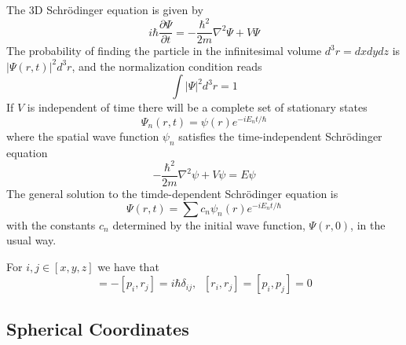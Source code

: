 \documentclass[12pt, a4paper, oneside, openright, titlepage]{book}
\begin{document}
The 3D Schr\"{o}dinger equation is given by \begin{equation*}
    \boxed{i\hbar\frac{\partial \Psi}{\partial t} = -\frac{\hbar^2}{2m}\nabla^2\Psi + V\Psi}
\end{equation*}
The probability of finding the particle in the infinitesimal volume $d^3r = dxdydz$ is $|\Psi(r,t)|^2d^3r$, and the normalization condition reads $$\int|\Psi|^2d^3r = 1$$
If $V$ is independent of time there will be a complete set of stationary states \begin{equation*}
    \Psi_n(r,t) = \psi(r)e^{-iE_nt/\hbar}
\end{equation*}
where the spatial wave function $\psi_n$ satisfies the time-independent Schr\"{o}dinger equation \begin{equation*}
    \boxed{-\frac{\hbar^2}{2m}\nabla^2\psi + V\psi = E\psi}
\end{equation*}
The general solution to the timde-dependent Schr\"{o}dinger equation is \begin{equation*}
    \Psi(r,t) = \sum c_n\psi_n(r)e^{-iE_nt/\hbar}
\end{equation*}
with the constants $c_n$ determined by the initial wave function, $\Psi(r,0)$, in the usual way.

\begin{rmk}
    For $i,j \in [x,y,z]$ we have that \begin{equation*}
        [r_i,p_j] = -[p_i,r_j] = i\hbar\delta_{ij},\;\;[r_i,r_j] = [p_i,p_j] = 0
    \end{equation*}
\end{rmk}

\subsection{Spherical Coordinates}
\end{document}
